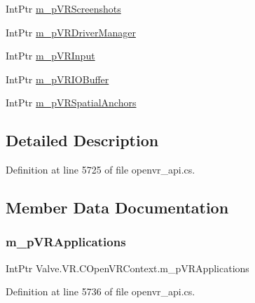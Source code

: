\begin{DoxyCompactItemize}
\item 
Int\+Ptr \mbox{\hyperlink{struct_valve_1_1_v_r_1_1_c_open_v_r_context_a885515e9e531dd89d8570ae39a11348e}{m\+\_\+p\+V\+R\+Screenshots}}
\item 
Int\+Ptr \mbox{\hyperlink{struct_valve_1_1_v_r_1_1_c_open_v_r_context_a9ab4f1fd1ce5afd51362dd30a7e7d183}{m\+\_\+p\+V\+R\+Driver\+Manager}}
\item 
Int\+Ptr \mbox{\hyperlink{struct_valve_1_1_v_r_1_1_c_open_v_r_context_ab36a641d7d958929983bd53f416a34ae}{m\+\_\+p\+V\+R\+Input}}
\item 
Int\+Ptr \mbox{\hyperlink{struct_valve_1_1_v_r_1_1_c_open_v_r_context_a0e08715c781866e607db4e6d5e022de3}{m\+\_\+p\+V\+R\+I\+O\+Buffer}}
\item 
Int\+Ptr \mbox{\hyperlink{struct_valve_1_1_v_r_1_1_c_open_v_r_context_aa8fd95e6f28ac4763413ad01b8b94525}{m\+\_\+p\+V\+R\+Spatial\+Anchors}}
\end{DoxyCompactItemize}


\subsection{Detailed Description}


Definition at line 5725 of file openvr\+\_\+api.\+cs.



\subsection{Member Data Documentation}
\mbox{\label{struct_valve_1_1_v_r_1_1_c_open_v_r_context_a3a2fddf032de06e7c7045fc8e3a28372}} 
\subsubsection{\texorpdfstring{m\_pVRApplications}{m\_pVRApplications}}
{\footnotesize\ttfamily Int\+Ptr Valve.\+V\+R.\+C\+Open\+V\+R\+Context.\+m\+\_\+p\+V\+R\+Applications}



Definition at line 5736 of file openvr\+\_\+api.\+cs.

\mbox{\label{struct_valve_1_1_v_r_1_1_c_open_v_r_context_a0d65653f2d13a0778deced4f8cb867bc}} 
